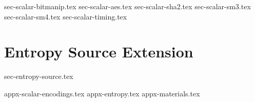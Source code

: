 \documentclass[11pt]{article}
\begin{document}
{sec-scalar-bitmanip.tex}
{sec-scalar-aes.tex}
\clearpage
{sec-scalar-sha2.tex}
{sec-scalar-sm3.tex}
{sec-scalar-sm4.tex}
\clearpage
{sec-scalar-timing.tex}


\newpage
\section{Entropy Source Extension}
\label{sec:randombit}
{sec-entropy-source.tex}


\newpage
\printbibliography


%
%

\newpage
\begin{appendices}
\label{sec:appendix}
{appx-scalar-encodings.tex}
{appx-entropy.tex}
{appx-materials.tex}
\end{appendices}

\end{document}
